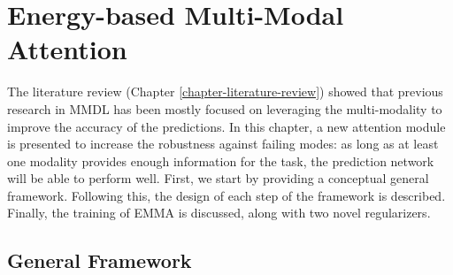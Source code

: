 \chapter{Energy-based Multi-Modal Attention} 
\label{chapter-emma} 

The literature review (Chapter \ref{chapter-literature-review}) showed that previous research in MMDL has been mostly focused on leveraging the multi-modality to improve the accuracy of the predictions. In this chapter, a new attention module is presented to increase the robustness against failing modes: as long as at least one modality provides enough information for the task, the prediction network will be able to perform well. First, we start by providing a conceptual general framework. Following this, the design of each step of the framework is described. Finally, the training of EMMA is discussed, along with two novel regularizers.


\section{General Framework}\label{sec:general-framework}

